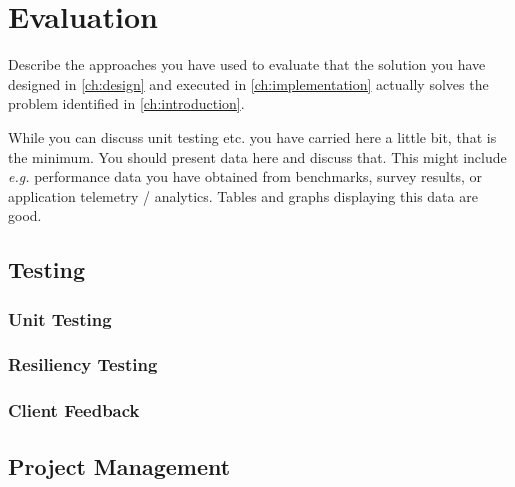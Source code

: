 \chapter{Evaluation}
\label{ch:evaluation}

Describe the approaches you have used to evaluate that the solution you have designed in \ref{ch:design} and executed in \ref{ch:implementation} actually solves the problem identified in \ref{ch:introduction}.

While you can discuss unit testing etc. you have carried here a little bit, that is the minimum. You should present data here and discuss that. This might include \emph{e.g.} performance data you have obtained from benchmarks, survey results, or application telemetry / analytics. Tables and graphs displaying this data are good.


\section{Testing}
\label{se:testing}


\subsection{Unit Testing}
\label{sse:unittesting}

\subsection{Resiliency Testing}
\label{sse:resiliencytesting}

\subsection{Client Feedback}
\label{se:clientfeedback}

\section{Project Management}
\label{se:projectmanagement}

